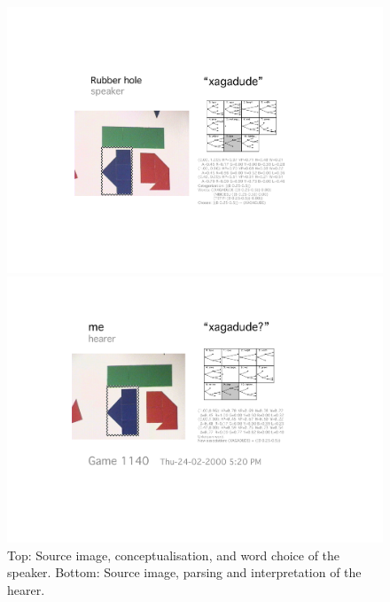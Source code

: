 \begin{figure}[htbp]
 \centerline{\includegraphics[width=.80\textwidth]{chap8/figures/xagadu-speaker}}
\centerline{\includegraphics[width=.80\textwidth]{chap8/figures/xagadu-hearer}}
\caption{\footnotesize\label{fig:interaction} 
Top: Source image, conceptualisation, and word choice of the speaker. Bottom: Source image, parsing and interpretation 
of the hearer.}
\end{figure}


